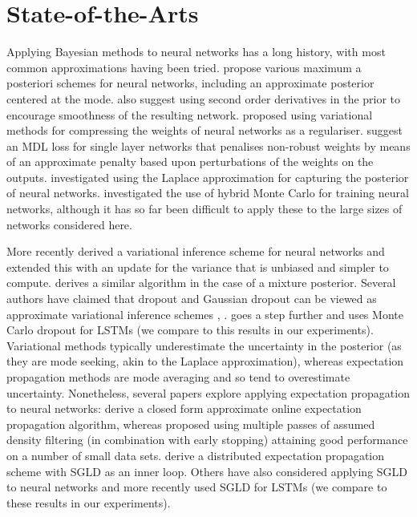 \section{State-of-the-Arts}
Applying Bayesian methods to neural networks has a long history, with most common approximations having been tried.
\cite{buntine1991bayesian} propose various maximum a posteriori schemes for neural networks, including an approximate posterior
centered at the mode.
\cite{buntine1991bayesian} also suggest using second order derivatives in the prior to encourage smoothness of the resulting network.
\cite{Hinton1993} proposed using variational methods for compressing the weights of neural networks as a regulariser.
\cite{Hochreiter1995} suggest an MDL loss for single layer networks that penalises non-robust weights by means of an approximate penalty based upon perturbations of the weights on the outputs.
\cite{Mackay1995} investigated using the Laplace approximation for capturing the posterior of neural networks.
\cite{neal2012bayesian} investigated the use of hybrid Monte Carlo for training neural networks, although it has so far been difficult to apply these to the large sizes of networks considered here.

More recently \cite{graves2011practical} derived a variational inference scheme for neural networks and
\cite{Blundell2015a} extended this with an update for the variance that is unbiased and simpler to compute.
\cite{Graves2016} derives a similar algorithm in the case of a mixture posterior.
Several authors have claimed that dropout \cite{Srivastava2014} and Gaussian dropout \cite{Wang2013} can be viewed as approximate variational inference schemes \cite{Gal2015}, \cite{Kingma2015}.
\cite{Gan2016} goes a step further and uses Monte Carlo dropout for LSTMs (we compare to this results in our experiments).
Variational methods typically underestimate the uncertainty in the posterior (as they are mode seeking, akin to the Laplace approximation), whereas expectation propagation methods are mode averaging and so tend to overestimate uncertainty.
Nonetheless, several papers explore applying expectation propagation to neural networks:
\cite{Soudry2014} derive a closed form approximate online expectation propagation algorithm, whereas \citet{hernandez2015probabilistic} proposed using multiple passes of assumed density filtering (in combination with early stopping) attaining good performance on a number of small data sets.
\citet{hasenclever2015distributed} derive a distributed expectation propagation scheme with SGLD \cite{Welling2011} as an inner loop.
Others have also considered applying SGLD to neural networks \citep{li2015preconditioned} and \cite{Gan2016} more recently used SGLD for LSTMs (we compare to these results in our experiments).


